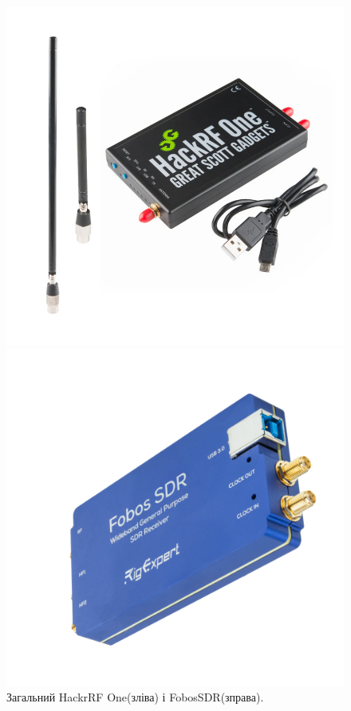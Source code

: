 \documentclass{article}
\begin{document}
\begin{figure}[H]
    \centering
       \begin{minipage}{0.4\textwidth}
        \centering
        \includegraphics[width=\textwidth]{images/hackrf.png}
    \end{minipage}
    \begin{minipage}{0.3\textwidth}
        \centering
        \includegraphics[width=\textwidth]{images/fobos.png}
    \end{minipage}
    \caption{\label{fig:hackrf}Загальний HackrRF One(зліва) і FobosSDR(зправа).}
\end{figure}
\end{document}
